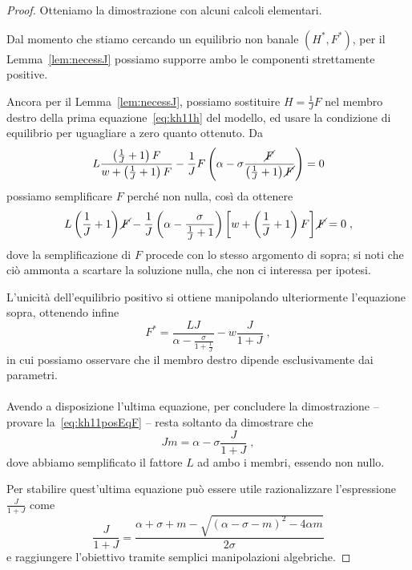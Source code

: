 \begin{proof}
    Otteniamo la dimostrazione con alcuni calcoli elementari.

    Dal momento che stiamo cercando un equilibrio non banale $(H^*, F^*)$, per il
    Lemma~\ref{lem:necessJ} possiamo supporre ambo le componenti strettamente positive.

    Ancora per il Lemma~\ref{lem:necessJ}, possiamo sostituire $H=\frac{1}{J} F$ nel membro destro della
    prima equazione~\eqref{eq:kh11h} del modello, ed usare la condizione di equilibrio per uguagliare
    a zero quanto ottenuto. Da
    $$L \frac{ \left( \frac{1}{J} +1 \right) F }{ w +\left( \frac{1}{J} +1 \right) F }
    - \frac{1}{J} F \left( \alpha - \sigma \frac{\cancel{F}}{ \left( \frac{1}{J} +1 \right) \cancel{F} } \right) = 0$$
    possiamo semplificare $F$ perché non nulla, così da ottenere
    $$L \left( \frac{1}{J} +1 \right) \cancel{F} - \frac{1}{J} \left( \alpha - \frac{\sigma}{ \frac{1}{J} +1 } \right)
    \left[ w + \left( \frac{1}{J} +1 \right) F \right] \cancel{F} = 0 \; ,$$
    dove la semplificazione di $F$ procede con lo stesso argomento di sopra; si noti che ciò ammonta a scartare la
    soluzione nulla, che non ci interessa per ipotesi.

    L'unicità dell'equilibrio positivo si ottiene manipolando ulteriormente l'equazione sopra, ottenendo infine
    $$F^* = \frac{LJ}{ \alpha - \frac{\sigma}{ 1 + \frac{1}{J} } } - w \frac{J}{1+J} \; ,$$
    in cui possiamo osservare che il membro destro dipende esclusivamente dai parametri.

    \paragraph{}
    Avendo a disposizione l'ultima equazione, per concludere la dimostrazione -- \ie provare la~\eqref{eq:kh11posEqF}
    -- resta soltanto da dimostrare che
    $$J m = \alpha - \sigma \frac{J}{1+J} \; ,$$
    dove abbiamo semplificato il fattore $L$ ad ambo i membri, essendo non nullo.

    Per stabilire quest'ultima equazione può essere utile razionalizzare l'espressione $\frac{J}{1+J}$ come
    $$\frac{J}{1+J} = \frac{ \alpha + \sigma + m - \sqrt{ {(\alpha - \sigma -m)}^2 - 4 \alpha m } }{2 \sigma}$$
    e raggiungere l'obiettivo tramite semplici manipolazioni algebriche.
\end{proof}


